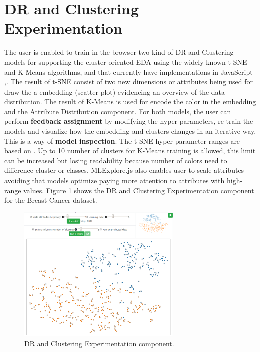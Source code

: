 \section{DR and Clustering Experimentation}
\label{section3.4}

The user is enabled to train in the browser two kind of DR and Clustering models for supporting the cluster-oriented EDA using the widely known t-SNE \cite{VanDerMaaten2008} and K-Means \cite{Lloyd1982LeastPCM} algorithms, and that currently have implementations in JavaScript \cite{Pezzotti2018LinearWeb},\cite{Asensio2018Ml-kmeans}. The result of t-SNE consist of two new dimensions or attributes being used for draw the a embedding (scatter plot) evidencing an overview of the data distribution. The result of K-Means is used for encode the color in the embedding and the Attribute Distribution component. For both models, the user can perform \textbf{feedback assignment} by modifying the hyper-parameters, re-train the models and visualize how the embedding and clusters changes in an iterative way. This is a way of \textbf{model inspection}. The t-SNE hyper-parameter ranges are based on \cite{Wattenberg2016HowEffectively}. Up to 10 number of clusters for K-Means training is allowed, this limit can be increased but losing readability because number of colors need to difference cluster or classes. MLExplore.js also enables user to scale attributes avoiding that models optimize paying more attention to attributes with high-range values. Figure \ref{fig:dr-and-clustering-experimentation-component} shows the DR and Clustering Experimentation component for the Breast Cancer dataset.

\begin{figure}[ht]
 \centering
 \includegraphics[width=0.7\textwidth]{dr-and-clustering-experimentation.png}
 \caption{DR and Clustering Experimentation component.}
 \label{fig:dr-and-clustering-experimentation-component}
\end{figure}

